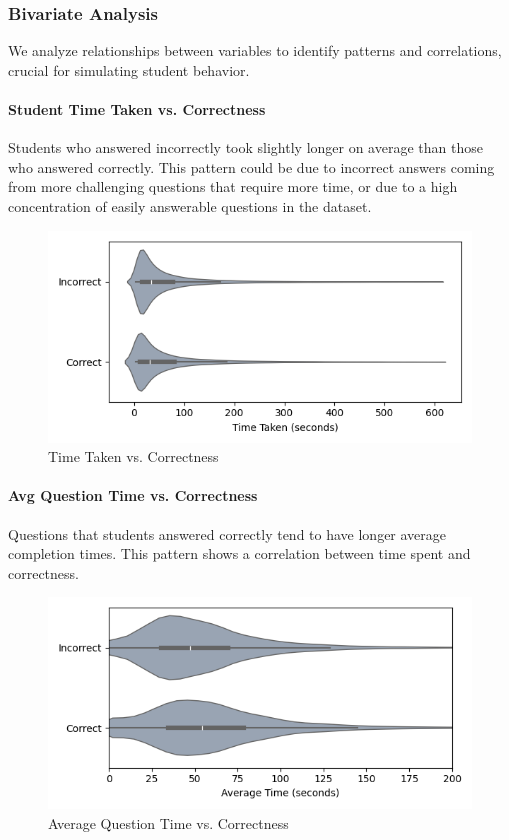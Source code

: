 \documentclass[
    a4paper, %
    10pt, %
    twoside, %
]{LTJournalArticle}
\begin{document}
\subsubsection{Bivariate Analysis}
We analyze relationships between variables to identify patterns and correlations, crucial for simulating student behavior.
\paragraph{Student Time Taken vs. Correctness}
Students who answered incorrectly took slightly longer on average than those who answered correctly. This pattern could be due to incorrect answers coming from more challenging questions that require more time, or due to a high concentration of easily answerable questions in the dataset.

\begin{figure}[H]
    \centering
    \includegraphics[width=\columnwidth]{images/time_vs_correctness.png}
    \caption{Time Taken vs. Correctness}
    \label{fig:time-vs-correctness}
\end{figure}

\paragraph{Avg Question Time vs. Correctness}
Questions that students answered correctly tend to have longer average completion times. This pattern shows a correlation between time spent and correctness.
\begin{figure}[H]
    \centering
    \includegraphics[width=\columnwidth]{images/avg_time_vs_correctness.png}
    \caption{Average Question Time vs. Correctness}
    \label{fig:avg-time-vs-correctness}
\end{figure}
\end{document}

